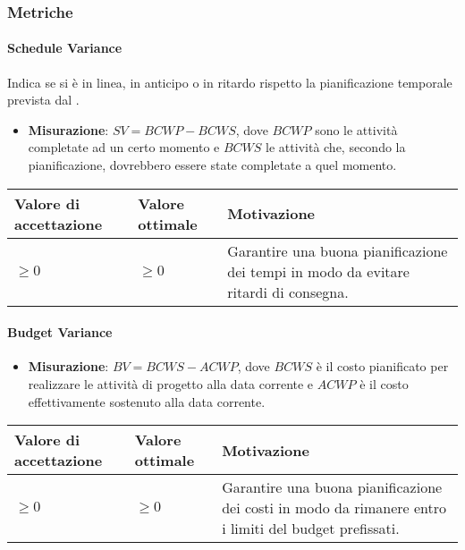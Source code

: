 \subsubsection{Metriche}

\paragraph{Schedule Variance}
Indica se si è in linea, in anticipo o in ritardo rispetto la pianificazione temporale prevista dal \PdP.

\begin{itemize}
\item \textbf{Misurazione}: $SV = BCWP - BCWS$, dove $BCWP$ sono le attività completate ad un certo momento e $BCWS$ le attività che, secondo la pianificazione, dovrebbero essere state completate a quel momento.
\end{itemize}

\begin{center}

		\begin{tabular}{|P{2.5cm}|P{2.5cm}|P{6cm}|}
		\hline
			\textbf{Valore di accettazione}	& \textbf{Valore ottimale} & \textbf{Motivazione} \\
			\hline
			$\geq 0$ & $\geq 0$ & Garantire una buona pianificazione dei tempi in modo da evitare ritardi di consegna. \\
			\hline
			\end{tabular}
\end{center}


\paragraph{Budget Variance}

\begin{itemize}
\item \textbf{Misurazione}: $BV = BCWS - ACWP$, dove $BCWS$ è il costo pianificato per realizzare le attività di progetto alla data corrente e $ACWP$ è il costo effettivamente sostenuto alla data corrente.
\end{itemize}

\begin{center}
	\begin{tabular}{|P{2.5cm}|P{2.5cm}|P{6cm}|}
		\hline
			\textbf{Valore di accettazione}	& \textbf{Valore ottimale} & \textbf{Motivazione} \\
			\hline
			$\geq 0$ & $\geq 0$ & Garantire una buona pianificazione dei costi in modo da rimanere entro i limiti del budget prefissati. \\
			\hline
			\end{tabular}
\end{center}

